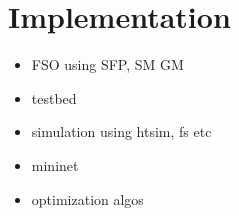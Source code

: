 
\section{Implementation}

\begin{itemize}
\item FSO using SFP, SM GM 
\item testbed
\item simulation using htsim, fs etc
\item mininet
\item optimization algos
\end{itemize}

